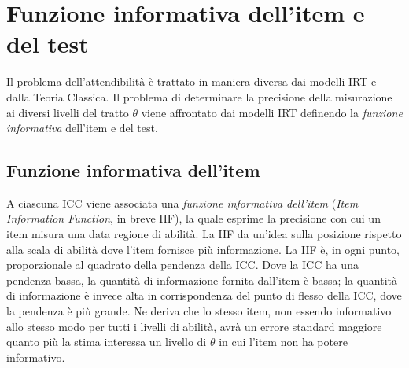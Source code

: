 \chapter{Funzione informativa dell'item e del test}
\label{chapter:funzione_informativa_item_test} 




Il problema dell'attendibilità è trattato in maniera diversa dai modelli IRT e dalla Teoria Classica.  
Il problema di determinare la precisione della misurazione ai diversi livelli del tratto $\theta$ viene affrontato dai modelli IRT definendo la \emph{funzione informativa} dell'item e del test.

\section{Funzione informativa dell'item}

A ciascuna ICC viene associata una \emph{funzione informativa dell'item} ({\it Item Information Function}, in breve IIF), la quale esprime la precisione con cui un item misura una data regione di abilità. La IIF da un'idea sulla posizione rispetto alla scala di abilità dove l'item fornisce più informazione. La IIF è, in ogni punto, proporzionale al quadrato della pendenza della ICC. Dove la ICC ha una pendenza bassa, la quantità di informazione fornita dall'item è bassa; la quantità di informazione è invece alta in corrispondenza del punto di flesso della ICC, dove la pendenza è più grande. Ne deriva che lo stesso item, non essendo informativo allo stesso modo per tutti i livelli di abilità, avrà un errore standard maggiore quanto più la stima interessa un livello di $\theta$ in cui l'item non ha potere informativo. 

